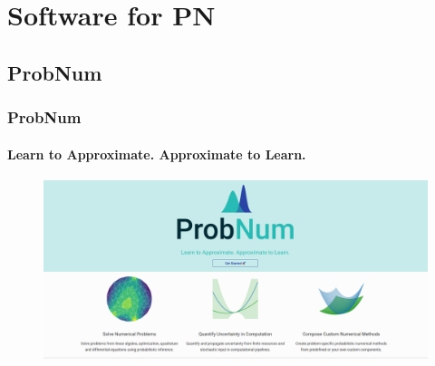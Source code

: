 \documentclass[10pt,usepdftitle=false,aspectratio=169]{beamer}
\begin{document}
\section{Software for PN}

\subsection{ProbNum}

\begin{frame}\frametitle{ProbNum}
	\framesubtitle{Learn to Approximate. Approximate to Learn.}

	\begin{figure}
		\centering
		\includegraphics[width=\textwidth]{figures/probnum.png}
	\end{figure}

\end{frame}
\end{document}
